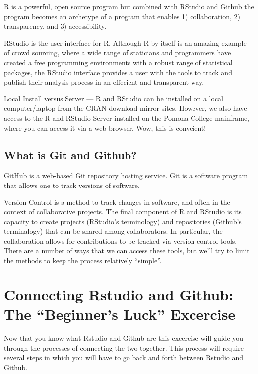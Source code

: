 \documentclass{article}\usepackage[]{graphicx}\usepackage[]{color}
\begin{document}
R is a powerful, open source program but combined with RStudio and Github the program becomes an archetype of a program that enables 1) collaboration, 2) transparency, and 3) accessibility.
  
RStudio is the user interface for R. Although R by itself is an amazing example of crowd sourcing, where a wide range of staticians and programmers have created a free programming environments with a robust range of statistical packages, the RStudio interface provides a user with the tools to track and publish their analysis process in an effecient and transparent way. 
  
Local Install versus Server --- R and RStudio can be installed on a local computer/laptop from the CRAN download mirror sites. However, we also have access to the R and RStudio Server installed on the Pomona College mainframe, where you can access it via a web browser. Wow, this is conveient!
  
  \subsection{What is Git and Github?}

GitHub is a web-based Git repository hosting service. Git is a software program that allows one to track versions of software.

Version Control is a method to track changes in software, and often in the context of collaborative projects. The final component of R and RStudio is its capacity to create projects (RStudio's terminology) and repositories (Github's terminalogy) that can be shared among collaborators. In particular, the collaboration allows for contributions to be tracked via version control tools. There are a number of ways that we can access these tools, but we'll try to limit the methods to keep the process relatively ``simple''.
  
  
  
\section{Connecting Rstudio and Github: The ``Beginner's Luck'' Excercise}
Now that you know what Rstudio and Github are this excercise will guide you through the processes of connecting the two together. This process will require several steps in which you will have to go back and forth between Rstudio and Github. 
\end{document}
